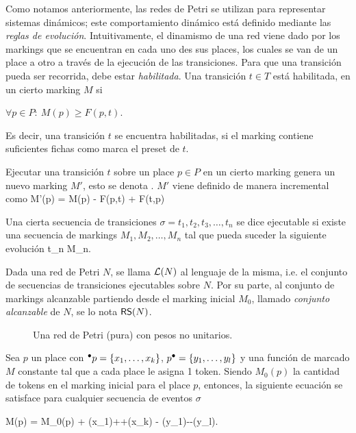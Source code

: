 Como notamos anteriormente, las redes de Petri se utilizan para representar sistemas 
dinámicos; este comportamiento dinámico está definido mediante las \emph{reglas de evolución}.
Intuitivamente, el dinamismo de una red viene dado por los markings que se encuentran en cada
uno des sus places, los cuales se van  de un place a otro a través de la 
ejecución de las transiciones. 
Para que una transición pueda ser recorrida, debe estar \emph{habilitada}. Una transición 
$t \in T$ está habilitada, en un cierto marking $M$ si 

\bequation
    \mbox{$\forall p \in P:~ M(p) \ge F(p,t) $}.
\eequation

Es decir, una transición $t$ se encuentra habilitadas, si el marking contiene suficientes
fichas como marca el preset de $t$.

Ejecutar una transición $t$ sobre un place $p \in P$ en un cierto marking genera 
un nuevo marking $M'$, esto se denota .
$M'$ viene definido de manera incremental como
\bequation
    M'(p) = M(p) - F(p,t) +  F(t,p)
\eequation

Una cierta secuencia de transiciones \mbox{$\sigma = t_1,t_2, t_3, \ldots, t_n$}
se dice ejecutable si existe una secuencia de markings \mbox{$M_1, M_2, \ldots, M_n$}
tal que pueda suceder la siguiente evolución
\bequation
     {t_n} {M_n}.
\eequation

Dada una red de Petri $N$, se llama $\mathcal{L}(N)$ al lenguaje de la misma, i.e.
el conjunto de secuencias de transiciones ejecutables sobre $N$.
Por su parte, al conjunto de markings alcanzable partiendo desde el marking inicial $M_0$,
llamado \emph{conjunto alcanzable} de $N$, se lo nota $\textsf{RS}(N)$.

\begin{figure}[h]
  	\centering
    
    \caption{Una red de Petri (pura) con pesos no unitarios.}
    \label{fig:pn1}
\end{figure}

Sea $p$ un place con \mbox{$\mbox{$^\bullet p$}=\{x_1,\ldots,x_k\}$}, \mbox{$\mbox{$p^\bullet$}=\{y_1,\ldots,y_l\}$} 
y una función de marcado $M$ constante  tal que a cada place le asigna 1 token.
Siendo $M_0(p)$ la cantidad de tokens en el marking inicial 
para el place $p$, entonces, la siguiente ecuación
se satisface para cualquier secuencia de eventos $\sigma$

    M(p) = M_0(p) + \widehat\sigma(x_1)+\cdots +\widehat\sigma(x_k) - \widehat\sigma(y_1)-\cdots -\widehat\sigma(y_l).
\eequation

